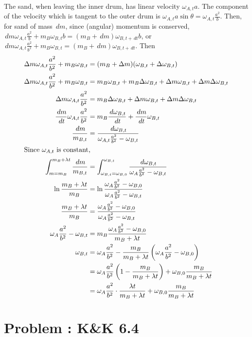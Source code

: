 \documentclass[solutions]{esg8012pset}
\renewcommand{\d}{\,d}
\begin{document}
  The sand, when leaving the inner drum, has linear velocity $\omega_{A,t}a$.  The component of the velocity which is tangent to the outer drum is $\omega_{A,t}a\sin\theta = \omega_{A,t}\frac{a^2}{b}$.  Then, for sand of mass $\d m$, since (angular) momentum is conserved, $\d m \omega_{A,t}\frac{a^2}{b} + m_B \omega_{B,t} b = (m_B + \d m)\omega_{B,t+\d t}b$, or $\d m \omega_{A,t}\frac{a^2}{b^2} + m_B \omega_{B,t} = (m_B + \d m)\omega_{B,t+\d t}$.  Then \begin{align*}
  \Delta m \omega_{A,t}\frac{a^2}{b^2} + m_B \omega_{B,t} & = (m_B + \Delta m)(\omega_{B,t} + \Delta \omega_{B, t}) \\
  \Delta m \omega_{A,t}\frac{a^2}{b^2} + m_B \omega_{B,t} & = m_B \omega_{B,t} + m_B \Delta \omega_{B, t} + \Delta m \omega_{B,t} + \Delta m \Delta \omega_{B, t} \\
  \Delta m \omega_{A,t}\frac{a^2}{b^2} & = m_B \Delta \omega_{B, t} + \Delta m \omega_{B,t} + \Delta m \Delta \omega_{B, t} \\
  \frac{\d m}{\d t} \omega_{A,t}\frac{a^2}{b^2} & = m_B \frac{\d \omega_{B, t}}{\d t} + \frac{\d m}{\d t} \omega_{B,t} \\
  \frac{\d m}{m_{B, t}} & = \frac{\d \omega_{B, t}}{\omega_{A,t}\frac{a^2}{b^2} - \omega_{B,t}} \\
  \intertext{Since $\omega_{A, t}$ is constant,}
  \int_{m = m_B}^{m_B + \lambda t}\frac{\d m}{m_{B, t}} & = \int_{\omega_{B, t} = \omega_{B, 0}}^{\omega_{B, t}}\frac{\d \omega_{B, t}}{\omega_A\frac{a^2}{b^2} - \omega_{B,t}} \\
  \ln\frac{m_B + \lambda t}{m_B} & = \ln\frac{\omega_A\frac{a^2}{b^2} - \omega_{B,0}}{\omega_A\frac{a^2}{b^2} - \omega_{B,t}} \\
  \frac{m_B + \lambda t}{m_B} & = \frac{\omega_A\frac{a^2}{b^2} - \omega_{B,0}}{\omega_A\frac{a^2}{b^2} - \omega_{B,t}} \\
  \omega_A\frac{a^2}{b^2} - \omega_{B,t} & = m_B\frac{\omega_A\frac{a^2}{b^2} - \omega_{B,0}}{m_B + \lambda t} \\
  \omega_{B,t} & = \omega_A\frac{a^2}{b^2} - \frac{m_B}{m_B + \lambda t}\left(\omega_A\frac{a^2}{b^2} - \omega_{B,0}\right) \\
    & = \omega_A\frac{a^2}{b^2}\left(1 - \frac{m_B}{m_B + \lambda t}\right) + \omega_{B,0}\frac{m_B}{m_B + \lambda t} \\
    & = \omega_A\frac{a^2}{b^2}\cdot \frac{\lambda t}{m_B + \lambda t} + \omega_{B,0}\frac{m_B}{m_B + \lambda t}
  \end{align*}
\section{Problem \thesection: K\&K 6.4}
\end{document}
